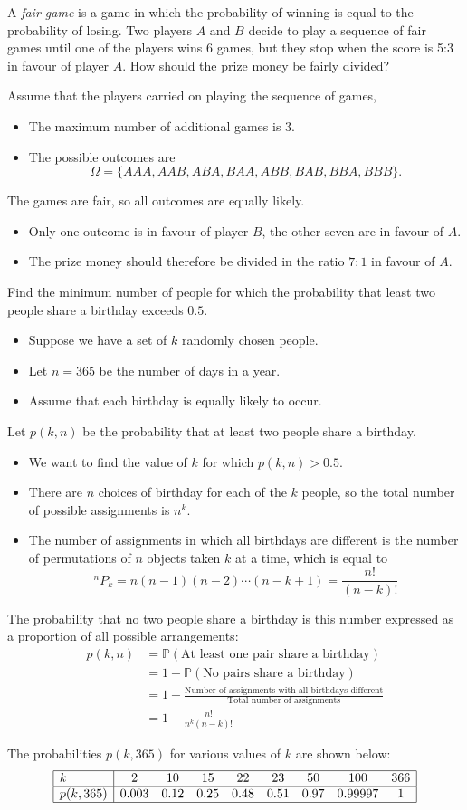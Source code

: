 \documentclass[lecture]{csm}
\newcommand{\prob}{\mathbb{P}}
\def\it{\item}
\def\bit{\begin{itemize}}
\def\eit{\end{itemize}}
\begin{document}
\begin{example}
A \emph{fair game} is a game in which the probability of winning is equal to the probability of losing. Two players $A$ and $B$ decide to play a sequence of fair games until one of the players wins 6 games, but they stop when the score is 5:3 in favour of player $A$. How should the prize money be fairly divided?
\begin{solution}
Assume that the players carried on playing the sequence of games,
\bit
\it The maximum number of additional games is 3.
\it The possible outcomes are 
\[
\Omega=\{AAA,AAB,ABA,BAA,ABB,BAB,BBA,BBB\}.
\]
\eit
The games are fair, so all outcomes are equally likely.
\bit
\it Only one outcome is in favour of player $B$, the other seven are in favour of $A$.
\it The prize money should therefore be divided in the ratio $7:1$ in favour of $A$.
\eit
\end{solution}
\end{example}

\newpage

\begin{example}
Find the minimum number of people for which the probability that least two people share a birthday exceeds $0.5$.
\begin{solution}
\bit
\it Suppose we have a set of $k$ randomly chosen people.
\it Let $n=365$ be the number of days in a year. 
\it Assume that each birthday is equally likely to occur.
\eit

Let $p(k,n)$ be the probability that at least two people share a birthday.
\bit
\it We want to find the value of $k$ for which $p(k,n) > 0.5$.
\it There are $n$ choices of birthday for each of the $k$ people, so the total number of possible assignments is $n^k$. 
\it The number of assignments in which all birthdays are different is the number of permutations of $n$ objects taken $k$ at a time, which is equal to 
\[
^nP_k = n(n-1)(n-2)\cdots(n-k+1) = \frac{n!}{(n-k)!}
\]
\eit

\newpage
The probability that no two people share a birthday is this number expressed as a proportion of all possible arrangements:
\begin{align*}
p(k,n)
	& = \prob(\text{At least one pair share a birthday}) \\
	& =  1 - \prob(\text{No pairs share a birthday}) \\
	& =  1 - \frac{\text{Number of assignments with all birthdays different}}{\text{Total number of assignments}} \\
	& =  1 - \frac{n!}{n^k(n-k)!}
\end{align*}

The probabilities $p(k,365)$ for various values of $k$ are shown below:
\[
\begin{array}{|l|cccccccc|} \hline
k			& 2		& 10		& 15		& 22		& 23		& 50 	& 100		& 366 	\\ \hline
p(k,365)		& 0.003	& 0.12	& 0.25	& 0.48	& 0.51	& 0.97	& 0.99997 & 1		\\ \hline
\end{array}
\]
\end{solution}
\end{example}

\end{document}

